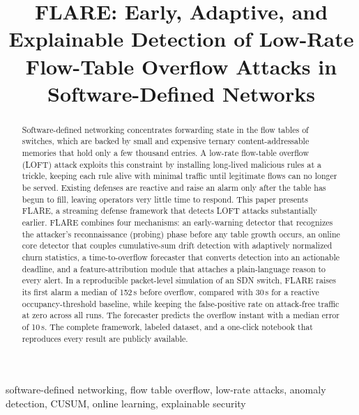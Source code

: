 \documentclass[conference]{IEEEtran}
\begin{document}
\title{FLARE: Early, Adaptive, and Explainable Detection of Low-Rate
Flow-Table Overflow Attacks in Software-Defined Networks}

\author{
}

\maketitle

\begin{abstract}
Software-defined networking concentrates forwarding state in the flow tables of
switches, which are backed by small and expensive ternary content-addressable
memories that hold only a few thousand entries. A low-rate flow-table overflow
(LOFT) attack exploits this constraint by installing long-lived malicious rules
at a trickle, keeping each rule alive with minimal traffic until legitimate
flows can no longer be served. Existing defenses are reactive and raise an alarm
only after the table has begun to fill, leaving operators very little time to
respond. This paper presents FLARE, a streaming defense framework that detects
LOFT attacks substantially earlier. FLARE combines four mechanisms: an
early-warning detector that recognizes the attacker's reconnaissance (probing)
phase before any table growth occurs, an online core detector that couples
cumulative-sum drift detection with adaptively normalized churn statistics, a
time-to-overflow forecaster that converts detection into an actionable deadline,
and a feature-attribution module that attaches a plain-language reason to every
alert. In a reproducible packet-level simulation of an SDN switch, FLARE raises
its first alarm a median of 152\,s before overflow, compared with 30\,s for a
reactive occupancy-threshold baseline, while keeping the false-positive rate on
attack-free traffic at zero across all runs. The forecaster predicts the
overflow instant with a median error of 10\,s. The complete framework, labeled
dataset, and a one-click notebook that reproduces every result are publicly
available.
\end{abstract}

\begin{IEEEkeywords}
software-defined networking, flow table overflow, low-rate attacks, anomaly
detection, CUSUM, online learning, explainable security
\end{IEEEkeywords}
\end{document}
